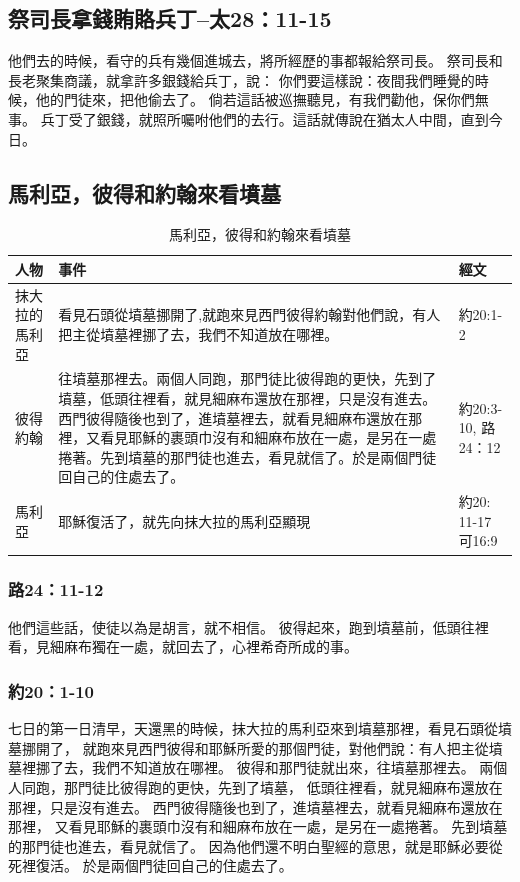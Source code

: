 \subsection{祭司長拿錢賄賂兵丁--太28：11-15}
他們去的時候，看守的兵有幾個進城去，將所經歷的事都報給祭司長。
祭司長和長老聚集商議，就拿許多銀錢給兵丁，說：
你們要這樣說：夜間我們睡覺的時候，他的門徒來，把他偷去了。
倘若這話被巡撫聽見，有我們勸他，保你們無事。
兵丁受了銀錢，就照所囑咐他們的去行。這話就傳說在猶太人中間，直到今日。

\subsection{馬利亞，彼得和約翰來看墳墓}

\begin{table}[htbp]
  \centering
    \begin{tabular}{|p{4.645em}|p{26.43em}|p{5.57em}|}
    \toprule
 \multicolumn{1}{|p{4.645em}|}{\textbf{人物}} & \multicolumn{1}{p{26.43em}|}{\textbf{事件}} & \multicolumn{1}{p{5.57em}|}{\textbf{經文}} \\
    \midrule
    抹大拉的馬利亞 & 看見石頭從墳墓挪開了,就跑來見西門彼得約翰對他們說，有人把主從墳墓裡挪了去，我們不知道放在哪裡。 & 約20:1-2 \\
     \midrule 
 彼得約翰  & 往墳墓那裡去。兩個人同跑，那門徒比彼得跑的更快，先到了墳墓，低頭往裡看，就見細麻布還放在那裡，只是沒有進去。西門彼得隨後也到了，進墳墓裡去，就看見細麻布還放在那裡，又看見耶穌的裹頭巾沒有和細麻布放在一處，是另在一處捲著。先到墳墓的那門徒也進去，看見就信了。於是兩個門徒回自己的住處去了。 & 約20:3-10, 路24：12 \\
  \midrule 
馬利亞   & 耶穌復活了，就先向抹大拉的馬利亞顯現 & 約20: 11-17可16:9 \\
 \bottomrule
    \end{tabular}%
     \caption{馬利亞，彼得和約翰來看墳墓}
  \label{tab:addlabel}%
\end{table}

\subsubsection{路24：11-12}
他們這些話，使徒以為是胡言，就不相信。
彼得起來，跑到墳墓前，低頭往裡看，見細麻布獨在一處，就回去了，心裡希奇所成的事。


\subsubsection{約20：1-10}
七日的第一日清早，天還黑的時候，抹大拉的馬利亞來到墳墓那裡，看見石頭從墳墓挪開了，
就跑來見西門彼得和耶穌所愛的那個門徒，對他們說：有人把主從墳墓裡挪了去，我們不知道放在哪裡。
彼得和那門徒就出來，往墳墓那裡去。
兩個人同跑，那門徒比彼得跑的更快，先到了墳墓，
低頭往裡看，就見細麻布還放在那裡，只是沒有進去。
西門彼得隨後也到了，進墳墓裡去，就看見細麻布還放在那裡，
又看見耶穌的裹頭巾沒有和細麻布放在一處，是另在一處捲著。
先到墳墓的那門徒也進去，看見就信了。
因為他們還不明白聖經的意思，就是耶穌必要從死裡復活。
於是兩個門徒回自己的住處去了。

